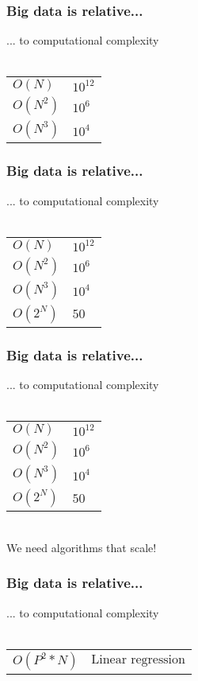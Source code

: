 \documentclass{beamer}
\begin{document}
\begin{frame}
	\frametitle{Big data is relative...}
	\begin{center}
		... to computational complexity\\~\\
		\begin{tabular}{ l l }
			$O(N)$ & $10^{12}$ \\
			$O(N^2) $ & $ 10^{6}$\\
			$O(N^3) $ & $ 10^{4}$\\			
		\end{tabular}
	\end{center}
\end{frame}

\begin{frame}
	\frametitle{Big data is relative...}
	\begin{center}
		... to computational complexity\\~\\
		\begin{tabular}{ l l }
			$O(N)$ & $10^{12}$ \\
			$O(N^2) $ & $ 10^{6}$\\
			$O(N^3) $ & $ 10^{4}$\\
			$O(2^N) $ & $ 50$\\				
		\end{tabular}
	\end{center}
\end{frame}

\begin{frame}
	\frametitle{Big data is relative...}
	\begin{center}
		... to computational complexity\\~\\
		\begin{tabular}{ l l }
			$O(N)$ & $10^{12}$ \\
			$O(N^2) $ & $ 10^{6}$\\
			$O(N^3) $ & $ 10^{4}$\\
			$O(2^N) $ & $ 50$\\				
		\end{tabular}
		\medskip
		\\We need algorithms that scale!
	\end{center}
\end{frame}

\begin{frame}
	\frametitle{Big data is relative...}
	\begin{center}
		... to computational complexity\\~\\
		\begin{tabular}{ l l }
			$O(P^2 * N) $ & $ \text{Linear regression}$\\
		\end{tabular}
	\end{center}
\end{frame}
\end{document}
